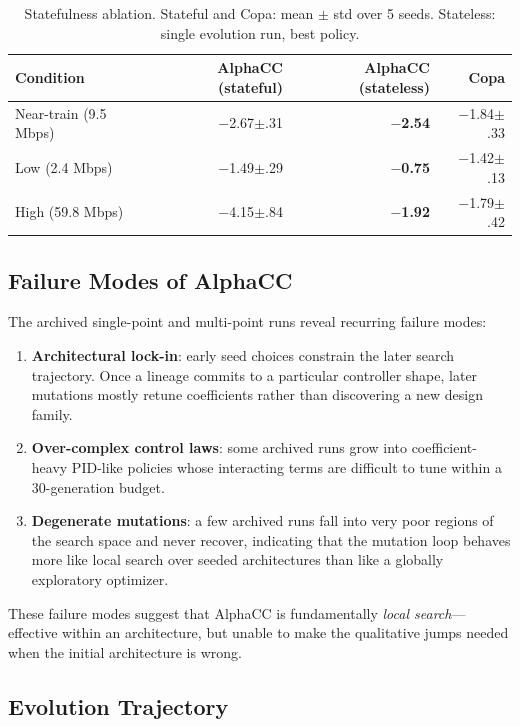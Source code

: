 \begin{table}[t]
\centering
\caption{Statefulness ablation. Stateful and Copa: mean $\pm$ std over 5
seeds. Stateless: single evolution run, best policy.}
\label{tab:ablation}
\small
\begin{tabular}{@{}lrrr@{}}
\toprule
Condition & AlphaCC (stateful) & AlphaCC (stateless) & Copa \\
\midrule
Near-train (9.5 Mbps) & $-$2.67{\scriptsize$\pm$.31} & \textbf{$-$2.54} & $-$1.84{\scriptsize$\pm$.33} \\
Low (2.4 Mbps) & $-$1.49{\scriptsize$\pm$.29} & \textbf{$-$0.75} & $-$1.42{\scriptsize$\pm$.13} \\
High (59.8 Mbps) & $-$4.15{\scriptsize$\pm$.84} & \textbf{$-$1.92} & $-$1.79{\scriptsize$\pm$.42} \\
\bottomrule
\end{tabular}
\end{table}

\subsection{Failure Modes of AlphaCC}
\label{sec:failures}

The archived single-point and multi-point runs reveal recurring failure modes:

\begin{enumerate}
\item \textbf{Architectural lock-in}: early seed choices constrain the later
  search trajectory. Once a lineage commits to a particular controller shape,
  later mutations mostly retune coefficients rather than discovering a new
  design family.
\item \textbf{Over-complex control laws}: some archived runs grow into
  coefficient-heavy PID-like policies whose interacting terms are difficult to
  tune within a 30-generation budget.
\item \textbf{Degenerate mutations}: a few archived runs fall into very poor
  regions of the search space and never recover, indicating that the mutation
  loop behaves more like local search over seeded architectures than like a
  globally exploratory optimizer.
\end{enumerate}

These failure modes suggest that AlphaCC is fundamentally
\emph{local search}---effective within an architecture, but unable to make the
qualitative jumps needed when the initial architecture is wrong.

\subsection{Evolution Trajectory}

